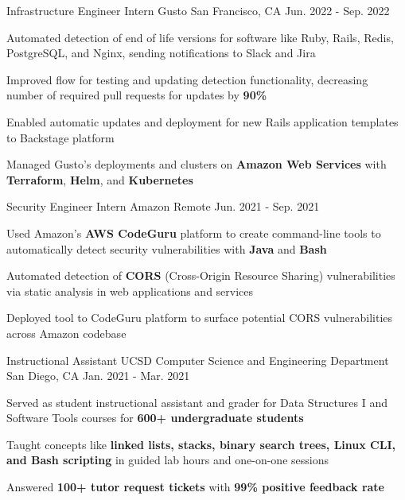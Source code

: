 \begin{cventries}
\cventry
{Infrastructure Engineer Intern} %
{Gusto} %
{San Francisco, CA} %
{Jun. 2022 - Sep. 2022} %
{
  \begin{cvitems} %
    \item {Automated detection of end of life versions for software like Ruby, Rails, Redis, PostgreSQL, and Nginx, sending notifications to Slack and Jira}
    \item {Improved flow for testing and updating detection functionality, decreasing number of required pull requests for updates by \textbf{90\%}}
    \item {Enabled automatic updates and deployment for new Rails application templates to Backstage platform}
    \item {Managed Gusto's deployments and clusters on \textbf{Amazon Web Services} with \textbf{Terraform}, \textbf{Helm}, and \textbf{Kubernetes}}
  \end{cvitems}
}

\cventry
  {Security Engineer Intern} %
  {Amazon} %
  {Remote} %
  {Jun. 2021 - Sep. 2021} %
  {
    \begin{cvitems} %
      \item {Used Amazon's \textbf{AWS CodeGuru} platform to create command-line tools to automatically detect security vulnerabilities with \textbf{Java} and \textbf{Bash}}
      \item {Automated detection of \textbf{CORS} (Cross-Origin Resource Sharing) vulnerabilities via static analysis in web applications and services}
      \item {Deployed tool to CodeGuru platform to surface potential CORS vulnerabilities across Amazon codebase}
    \end{cvitems}
  }

  \cventry
    {Instructional Assistant} %
    {UCSD Computer Science and Engineering Department} %
    {San Diego, CA} %
    {Jan. 2021 - Mar. 2021} %
    {
      \begin{cvitems} %
        \item {Served as student instructional assistant and grader for Data Structures I and Software Tools courses for \textbf{600+ undergraduate students}}
        \item {Taught concepts like \textbf{linked lists, stacks, binary search trees, Linux CLI, and Bash scripting} in guided lab hours and one-on-one sessions}
        \item {Answered \textbf{100+ tutor request tickets} with \textbf{99\% positive feedback rate}}
      \end{cvitems}
    }


\end{cventries}
